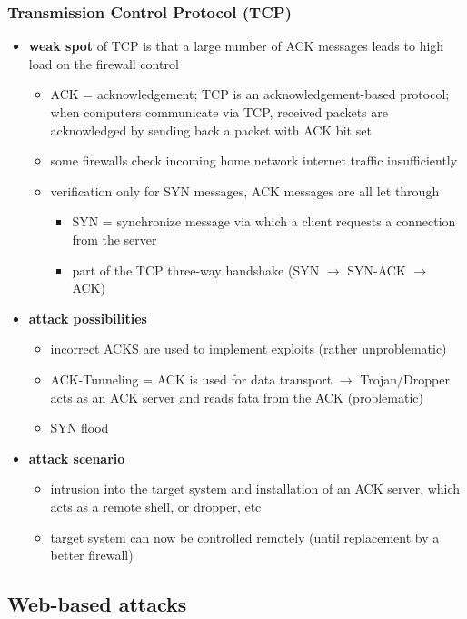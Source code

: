 \documentclass[11pt]{article}
\begin{document}
\subsubsection{Transmission Control Protocol (TCP)}
\label{sec:org7b1905a}
\begin{itemize}
\item \textbf{weak spot} of TCP is that a large number of ACK messages leads to high load on the firewall control
\begin{itemize}
\item ACK = acknowledgement; TCP is an acknowledgement-based protocol; when computers communicate via TCP, received packets are acknowledged by sending back a packet with ACK bit set
\item some firewalls check incoming home network internet traffic insufficiently
\item verification only for SYN messages, ACK messages are all let through
\begin{itemize}
\item SYN =  synchronize message via which a client requests a connection from the server
\item part of the TCP three-way handshake (SYN \(\rightarrow\) SYN-ACK \(\rightarrow\) ACK)
\end{itemize}
\end{itemize}
\item \textbf{attack possibilities}
\begin{itemize}
\item incorrect ACKS are used to implement exploits (rather unproblematic)
\item ACK-Tunneling = ACK is used for data transport \(\rightarrow\) Trojan/Dropper acts as an ACK server and reads fata from the ACK (problematic)
\item \href{https://en.wikipedia.org/wiki/SYN\_flood}{SYN flood}
\end{itemize}
\item \textbf{attack scenario}
\begin{itemize}
\item intrusion into the target system and installation of an ACK server, which acts as a remote shell, or dropper, etc
\item target system can now be controlled remotely (until replacement by a better firewall)
\end{itemize}
\end{itemize}

\subsection{Web-based attacks}
\label{sec:org67b6336}
\end{document}
